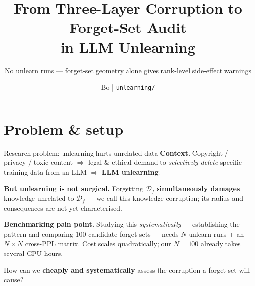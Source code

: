 \documentclass[aspectratio=169,10pt]{beamer}
\title{From Three-Layer Corruption to Forget-Set Audit\\ in LLM Unlearning}
\subtitle{No unlearn runs --- forget-set geometry alone gives rank-level side-effect warnings}
\date{}
\author{Bo \;|\; \texttt{unlearning/}}
\institute{Llama-3.1-8B-Instruct \;+\; GradAscent \;+\; WikiText-103 (HDBSCAN $\times$ 10)}
\begin{document}
\maketitle

\section{Problem \& setup}

\begin{frame}{Research problem: unlearning hurts unrelated data}
    \textbf{Context.}\;
    Copyright / privacy / toxic content $\Rightarrow$ legal \& ethical demand to
    \emph{selectively delete} specific training data from an LLM $\Rightarrow$
    \textbf{LLM unlearning}.

    \vspace{0.5em}
    \textbf{But unlearning is not surgical.}
    Forgetting $\mathcal{D}_f$ \textbf{simultaneously damages} knowledge unrelated to $\mathcal{D}_f$ ---
    we call this \alert{knowledge corruption}; its radius and consequences are not yet characterised.

    \vspace{0.5em}
    \textbf{Benchmarking pain point.}
    Studying this \emph{systematically} --- establishing the pattern and comparing
    100 candidate forget sets --- needs $N$ unlearn runs + an $N \!\times\! N$ cross-PPL matrix.
    Cost scales quadratically; our $N=100$ already takes several GPU-hours.

    \vspace{0.8em}
    \begin{center}
        \large
        \alert{How can we \textbf{cheaply and systematically} assess the corruption a forget set will cause?}
    \end{center}
\end{frame}
\end{document}
